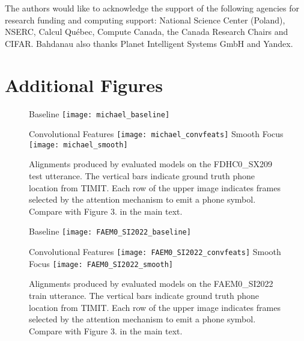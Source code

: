 \documentclass{article}
\begin{document}
The authors would like to acknowledge the support of the following agencies for
research funding and computing support: National Science Center (Poland), 
NSERC, Calcul Qu\'{e}bec, Compute Canada,
the Canada Research Chairs and CIFAR. Bahdanau also thanks Planet
Intelligent Systems GmbH and Yandex.


{\small


}

\clearpage
\appendix 
\section{Additional Figures}

\begin{figure}[h]
  \centering
  Baseline
  \texttt{[image: michael\_baseline]}

  Convolutional Features
  \texttt{[image: michael\_convfeats]}
  Smooth Focus
  \texttt{[image: michael\_smooth]}
\caption{Alignments
      produced by evaluated models on the FDHC0\_SX209 test utterance. The vertical bars
      indicate ground truth phone location from TIMIT. Each
      row of the upper image indicates frames selected by
      the attention mechanism to emit a phone symbol. Compare with
      Figure 3. in the main text.
  }  

  \vspace{-4mm}
\end{figure}

\begin{figure}[h]
  \centering
  Baseline
  \texttt{[image: FAEM0\_SI2022\_baseline]}

  Convolutional Features
  \texttt{[image: FAEM0\_SI2022\_convfeats]}
  Smooth Focus
  \texttt{[image: FAEM0\_SI2022\_smooth]}
\caption{Alignments
      produced by evaluated models on the FAEM0\_SI2022 train utterance. The vertical bars
      indicate ground truth phone location from TIMIT. Each
      row of the upper image indicates frames selected by
      the attention mechanism to emit a phone symbol. Compare with
      Figure 3. in the main text.
  }  

  \vspace{-4mm}
\end{figure}
\end{document}
